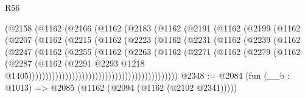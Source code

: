 \begin{lexlean}{R56}
\begin{coremodule}
                            (@2158
                              (@1162
                                (@2166
                                  (@1162
                                    (@2183
                                      (@1162
                                        (@2191
                                          (@1162
                                            (@2199
                                              (@1162
                                                (@2207
                                                  (@1162
                                                    (@2215
                                                      (@1162
                                                        (@2223
                                                          (@1162
                                                            (@2231
                                                              (@1162
                                                                (@2239
                                                                  (@1162
                                                                    (@2247
                                                                      (@1162
                                                                        (@2255
                                                                          (@1162
                                                                            (@2263
                                                                              (@1162
                                                                                (@2271
                                                                                  (@1162
                                                                                    (@2279
                                                                                      (@1162
                                                                                        (@2287
                                                                                          (@1162
                                                                                            (@2291
                                                                                              @2293
                                                                                              @1218
                                                                                              @1405)))))))))))))))))))))))))))))))))))))))))))))
@2348 := @2084 (fun (__b : @1013) => @2085 (@1162 (@2094 (@1162 (@2102 @2341)))))

\end{coremodule}
\end{lexlean}

